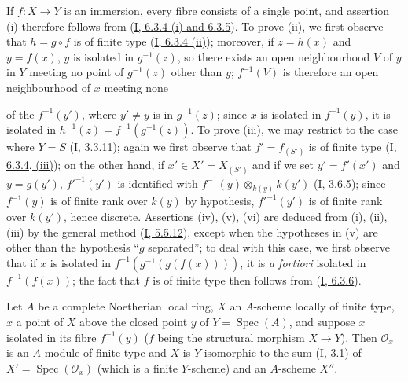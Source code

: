 If $f:X\to Y$ is an immersion, every fibre consists of a single point, and
assertion (i) therefore follows from (\hyperref[I.6.3.4]{I, 6.3.4 (i) and
6.3.5}). To prove (ii), we first observe that $h=g\circ f$ is of finite type
(\hyperref[I.6.3.4]{I, 6.3.4 (ii)}); moreover, if $z=h(x)$ and
$y=f(x)$, $y$ is isolated in $g^{-1}(z)$, so there exists an open
neighbourhood $V$ of $y$ in $Y$ meeting no point of $g^{-1}(z)$ other than
$y$; $f^{-1}(V)$ is therefore an open neighbourhood of $x$ meeting none


of the $f^{-1}(y')$, where $y'\neq y$ is in $g^{-1}(z)$; since $x$ is
isolated in $f^{-1}(y)$, it is isolated in
$h^{-1}(z)=f^{-1}(g^{-1}(z))$. To prove (iii), we may restrict to the case
where $Y=S$ (\hyperref[I.3.3.11]{I, 3.3.11}); again we first observe that
$f'=f_{(S')}$ is of finite type
(\hyperref[I.6.3.4]{I, 6.3.4, (iii)}); on the other hand, if
$x'\in X'=X_{(S')}$ and if we set $y'=f'(x')$ and $y=g(y')$,
$f'^{-1}(y')$ is identified with
$f^{-1}(y)\otimes_{k(y)}k(y')$ (\hyperref[I.3.6.5]{I, 3.6.5}); since
$f^{-1}(y)$ is of finite rank over $k(y)$ by hypothesis, $f'^{-1}(y')$ is of
finite rank over $k(y')$, hence discrete. Assertions (iv), (v), (vi) are
deduced from (i), (ii), (iii) by the general method
(\hyperref[I.5.5.12]{I, 5.5.12}), except when the hypotheses in (v) are
other than the hypothesis ``$g$ separated''; to deal with this case, we
first observe that if $x$ is isolated in
$f^{-1}(g^{-1}(g(f(x))))$, it is \emph{a fortiori} isolated in
$f^{-1}(f(x))$; the fact that $f$ is of finite type then follows from
(\hyperref[I.6.3.6]{I, 6.3.6}).

\begin{proposition}[6.2.5]
\label{II.6.2.5}
Let $A$ be a complete Noetherian local ring, $X$ an $A$-scheme locally of
finite type, $x$ a point of $X$ above the closed point $y$ of
$Y=\operatorname{Spec}(A)$, and suppose $x$ isolated in its fibre
$f^{-1}(y)$ ($f$ being the structural morphism $X\to Y$). Then
$\mathcal{O}_x$ is an $A$-module of finite type and $X$ is $Y$-isomorphic to
the sum (I, 3.1) of
$X'=\operatorname{Spec}(\mathcal{O}_x)$ (which is a finite $Y$-scheme) and an
$A$-scheme $X''$.
\end{proposition}

